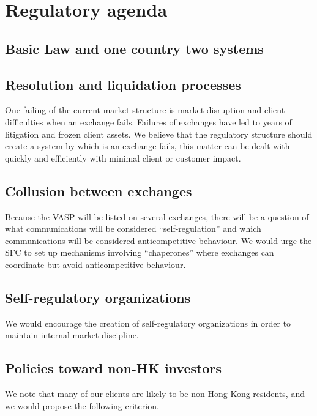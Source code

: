 \section{Regulatory agenda}

\subsection{Basic Law and one country two systems}


\subsection{Resolution and liquidation processes}

One failing of the current market structure is market disruption and
client difficulties when an exchange fails.  Failures of exchanges
have led to years of litigation and frozen client assets.  We believe
that the regulatory structure should create a system by which is an
exchange fails, this matter can be dealt with quickly and
efficiently with minimal client or customer impact.

\subsection{Collusion between exchanges}

Because the VASP will be listed on several exchanges, there
will be a question of what communications will be considered
``self-regulation'' and which communications will be considered
anticompetitive behaviour.  We would urge the SFC to set up mechanisms
involving ``chaperones'' where exchanges can coordinate but avoid
anticompetitive behaviour.

\subsection{Self-regulatory organizations}
We would encourage the creation of self-regulatory organizations in
order to maintain internal market discipline.  

\subsection{Policies toward non-HK investors}

We note that many of our clients are likely to be non-Hong Kong
residents, and we would propose the following criterion.


